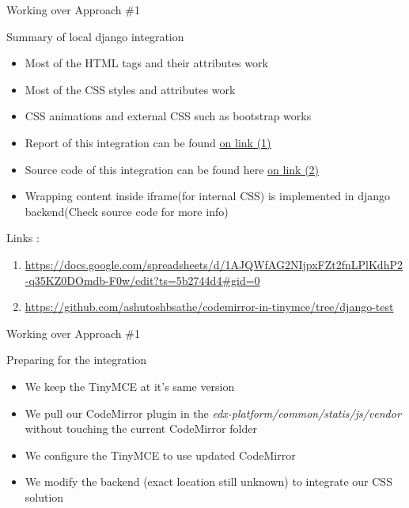 \documentclass{beamer}
\begin{document}
	\begin{frame}{Working over Approach \#1}
		\begin{block}{Summary of local django integration}
			\begin{itemize}
				\item Most of the HTML tags and their attributes work
				\item Most of the CSS styles and attributes work
				\item CSS animations and external CSS such as bootstrap works
				\item Report of this integration can be found \alert{\href{https://docs.google.com/spreadsheets/d/1AJQWfAG2NIjpxFZt2fnLPlKdhP2-q35KZ0DOmdb-F0w/edit?ts=5b2744d4\#gid=0}{on link (1)}}
				\item Source code of this integration can be found here \alert{\href{https://github.com/ashutoshbsathe/codemirror-in-tinymce/tree/django-test}{on link (2)}}
				\item Wrapping content inside iframe(for internal CSS) is implemented in django backend(Check source code for more info)
			\end{itemize}
		\end{block}
		\begin{block}{Links :}
			\tiny {\begin{enumerate}[I]
			\item \tiny{\href{https://docs.google.com/spreadsheets/d/1AJQWfAG2NIjpxFZt2fnLPlKdhP2-q35KZ0DOmdb-F0w/edit?ts=5b2744d4\#gid=0}{https://docs.google.com/spreadsheets/d/1AJQWfAG2NIjpxFZt2fnLPlKdhP2-q35KZ0DOmdb-F0w/edit?ts=5b2744d4\#gid=0}}
			\item \tiny{\href{https://github.com/ashutoshbsathe/codemirror-in-tinymce/tree/django-test}{https://github.com/ashutoshbsathe/codemirror-in-tinymce/tree/django-test}}
			\end{enumerate}
			}
		\end{block}
	\end{frame}
	
	\begin{frame}{Working over Approach \#1}
		\begin{block}{Preparing for the integration}
			\begin{itemize}
				\item We keep the TinyMCE at it's same version
				\item We pull our CodeMirror plugin in the \textit{edx-platform/common/statis/js/vendor} \alert{without touching the current CodeMirror folder}
				\item We configure the TinyMCE to use updated CodeMirror
				\item We modify the backend (exact location still unknown) to integrate our CSS solution
			\end{itemize}
		\end{block}
	\end{frame}
	
\end{document}
